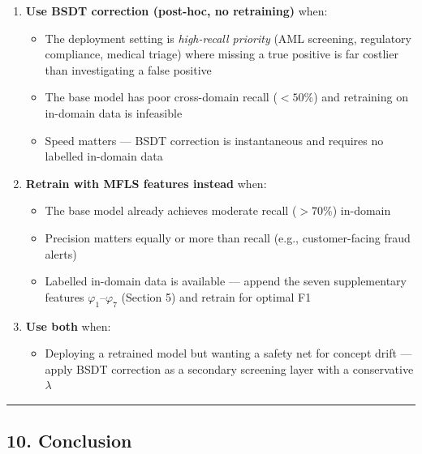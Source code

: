 \documentclass[
  11pt,
]{article}
\providecommand{\tightlist}{%
  \setlength{\itemsep}{0pt}\setlength{\parskip}{0pt}}
\begin{document}
\begin{enumerate}
\def\labelenumi{\arabic{enumi}.}
\tightlist
\item
  \textbf{Use BSDT correction (post-hoc, no retraining)} when:

  \begin{itemize}
  \tightlist
  \item
    The deployment setting is \emph{high-recall priority} (AML
    screening, regulatory compliance, medical triage) where missing a
    true positive is far costlier than investigating a false positive
  \item
    The base model has poor cross-domain recall (\(<50\%\)) and
    retraining on in-domain data is infeasible
  \item
    Speed matters — BSDT correction is instantaneous and requires no
    labelled in-domain data
  \end{itemize}
\item
  \textbf{Retrain with MFLS features instead} when:

  \begin{itemize}
  \tightlist
  \item
    The base model already achieves moderate recall (\(>70\%\))
    in-domain
  \item
    Precision matters equally or more than recall (e.g., customer-facing
    fraud alerts)
  \item
    Labelled in-domain data is available — append the seven
    supplementary features \(\varphi_1\)–\(\varphi_7\) (Section 5) and
    retrain for optimal F1
  \end{itemize}
\item
  \textbf{Use both} when:

  \begin{itemize}
  \tightlist
  \item
    Deploying a retrained model but wanting a safety net for concept
    drift — apply BSDT correction as a secondary screening layer with a
    conservative \(\lambda\)
  \end{itemize}
\end{enumerate}

\begin{center}\rule{0.5\linewidth}{0.5pt}\end{center}

\subsection{10. Conclusion}\label{conclusion}
\end{document}
